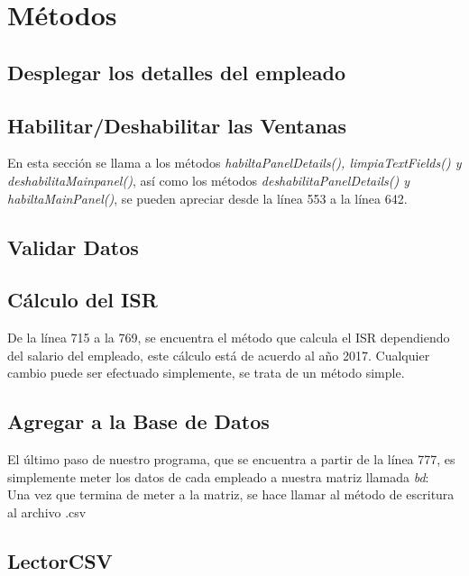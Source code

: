 \documentclass[12pt]{article}
\begin{document}
\section{M\'etodos}
\subsection{Desplegar los detalles del empleado}


\subsection{Habilitar/Deshabilitar las Ventanas}
{En esta secci\'on se llama a los m\'etodos \textit{habiltaPanelDetails(), limpiaTextFields() y deshabilitaMainpanel()}, as\'i como los m\'etodos \textit{deshabilitaPanelDetails() y habiltaMainPanel()}, se pueden apreciar desde la l\'inea 553 a la l\'inea 642.}

\subsection{Validar Datos}


\subsection{C\'alculo del ISR}
{De la l\'inea 715 a la 769, se encuentra el m\'etodo que calcula el ISR dependiendo del salario del empleado, este c\'alculo est\'a de acuerdo al a\~no 2017. Cualquier cambio puede ser efectuado simplemente, se trata de un m\'etodo simple.}

\subsection{Agregar a la Base de Datos}
{El \'ultimo paso de nuestro programa, que se encuentra a partir de la l\'inea 777, es simplemente meter los datos de cada empleado a nuestra matriz llamada \textit{bd}:}\\



{Una vez que termina de meter a la matriz, se hace llamar al m\'etodo de escritura al archivo .csv}

\subsection{LectorCSV}
\end{document}
